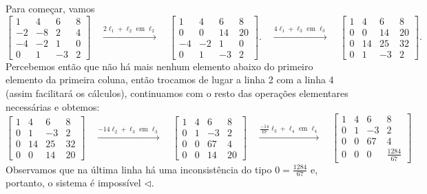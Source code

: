 \begin{resol}
Para começar, vamos
\begin{equation}
 \left[
  \begin{array}{ccc|c}
    1 & 4 & 6 & 8 \\
    -2 & -8 & 2 & 4 \\
    -4 & -2 & 1 & 0 \\
    0 & 1 & -3 & 2
  \end{array}
\right]
\quad \xrightarrow{2\ell_1 + \ell_2 \text{ em } \ell_2} \quad
 \left[
  \begin{array}{ccc|c}
    1 & 4 & 6 & 8 \\
    0 & 0 & 14 & 20 \\
    -4 & -2 & 1 & 0 \\
    0 & 1 & -3 & 2
  \end{array}
\right].
\quad \xrightarrow{4\ell_1 + \ell_3 \text{ em } \ell_3} \quad
 \left[
  \begin{array}{ccc|c}
    1 & 4 & 6 & 8 \\
    0 & 0 & 14 & 20 \\
    0 & 14 & 25 & 32 \\
    0 & 1 & -3 & 2
  \end{array}
\right].
\end{equation}
Percebemos então que não há mais nenhum elemento abaixo do primeiro elemento da primeira coluna, então trocamos de lugar a linha 2 com a linha 4 (assim facilitará os cálculos), continuamos com o resto das operações elementares necessárias e obtemos:
\begin{equation}
 \left[
  \begin{array}{ccc|c}
    1 & 4 & 6 & 8 \\
    0 & 1 & -3 & 2 \\
    0 & 14 & 25 & 32 \\
    0 & 0 & 14 & 20
  \end{array}
\right]
\quad \xrightarrow{-14\ell_2 + \ell_3 \text{ em } \ell_3} \quad
 \left[
  \begin{array}{ccc|c}
    1 & 4 & 6 & 8 \\
    0 & 1 & -3 & 2 \\
    0 & 0 & 67 & 4 \\
    0 & 0 & 14 & 20
  \end{array}
\right]
\quad \xrightarrow{\frac{-14}{67}\ell_3 + \ell_4 \text{ em } \ell_4} \quad
 \left[
  \begin{array}{ccc|c}
    1 & 4 & 6 & 8 \\
    0 & 1 & -3 & 2 \\
    0 & 0 & 67 & 4 \\
    0 & 0 & 0 & \frac{1284}{67}
  \end{array}
\right]
\end{equation}
Observamos que na última linha há uma inconsistência do tipo $0 = \frac{1284}{67}$ e, portanto, o sistema é impossível $\lhd$.
\end{resol}

